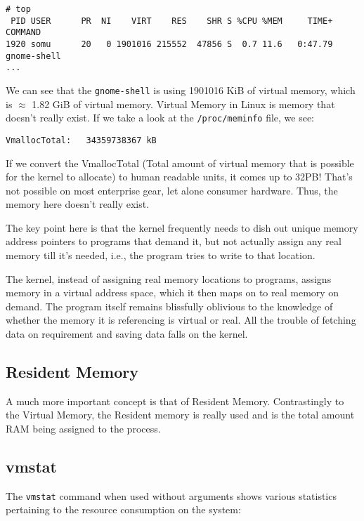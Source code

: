 \vspace{-15pt}
\begin{verbatim}
# top
 PID USER      PR  NI    VIRT    RES    SHR S %CPU %MEM     TIME+ COMMAND                                                   
1920 somu      20   0 1901016 215552  47856 S  0.7 11.6   0:47.79 gnome-shell                                               
...
\end{verbatim}
\vspace{-10pt}	

\noindent
We can see that the \verb|gnome-shell| is using 1901016 KiB of virtual memory, which is $\approx$ 1.82 GiB of virtual memory. Virtual Memory in Linux is memory that doesn't really exist. If we take a look at the \verb|/proc/meminfo| file, we see:

\vspace{-15pt}
\begin{verbatim}
VmallocTotal:   34359738367 kB
\end{verbatim}
\vspace{-10pt}	

\noindent
If we convert the VmallocTotal (Total amount of virtual memory that is possible for the kernel to allocate) to human readable units, it comes up to 32PB! That's not possible on most enterprise gear, let alone consumer hardware. Thus, the memory here doesn't really exist. 

The key point here is that the kernel frequently needs to dish out unique memory address pointers to programs that demand it, but not actually assign any real memory till it's needed, i.e., the program tries to write to that location.

The kernel, instead of assigning real memory locations to programs, assigns memory in a virtual address space, which it then maps on to real memory on demand. The program itself remains blissfully oblivious to the knowledge of whether the memory it is referencing is virtual or real. All the trouble of fetching data on requirement and saving data falls on the kernel. 

\subsection{Resident Memory}
A much more important concept is that of Resident Memory. Contrastingly to the Virtual Memory, the Resident memory is really used and is the total amount RAM being assigned to the process. 

\subsection{vmstat}
The \verb|vmstat| command when used without arguments shows various statistics pertaining to the resource consumption on the system:

